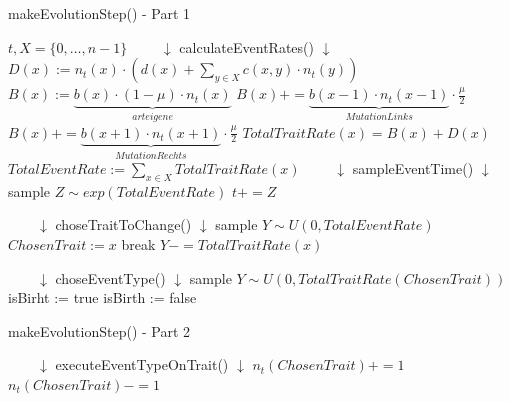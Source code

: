 \documentclass[11pt, a4paper, german]{article}
\theoremstyle{plain}
\begin{document}
	\begin{algorithm}[H]
		\caption{makeEvolutionStep() - Part 1}
		\begin{algorithmic}[1]
			\Require $ t, X = \{0,\dots, n-1\} $
			\State $ \qquad \downarrow $ \textcolor[rgb]{0,0,0.55}{calculateEventRates}() $ \downarrow $
				\State $  D(x) := n_t(x) \cdot \left( d(x) + \sum_{y \in X} c(x,y) \cdot n_t(y) \right) $
				\State $ B(x) := \underbrace{b(x) \cdot (1 - \mu) \cdot n_t(x)}_{arteigene}  $
					\State $ B(x) += \underbrace{b(x-1)\cdot n_t(x-1)}_{Mutation Links} \cdot \frac{\mu}{2} $
				\EndIf
					\State $ B(x) += \underbrace{b(x+1)\cdot n_t(x+1)}_{Mutation Rechts} \cdot \frac{\mu}{2} $
				\EndIf
				\State $ TotalTraitRate(x) = B(x) + D(x) $
			\EndFor
			\State $ TotalEventRate := \sum_{x \in X} TotalTraitRate(x) $
			\State $ \qquad \downarrow $ \textcolor[rgb]{0,0,0.55}{sampleEventTime}() $ \downarrow $
			\State sample $ Z \sim exp(TotalEventRate) $
			\State $ t += Z $
			
			\State $ \qquad \downarrow $ \textcolor[rgb]{0,0,0.55}{choseTraitToChange}() $ \downarrow $
			\State sample $ Y \sim U(0,TotalEventRate) $
					\State $ ChosenTrait := x $
					\State break
				\EndIf
				\State $ Y -= TotalTraitRate(x) $
			\EndFor
			
			\State $ \qquad \downarrow $ \textcolor[rgb]{0,0,0.55}{choseEventType()} $ \downarrow $
			\State sample $ Y \sim U(0,TotalTraitRate(ChosenTrait)) $
				\State isBirht := true
			\Else
				\State isBirth := false
			\EndIf
		\end{algorithmic}
	\end{algorithm}
	
	\begin{algorithm}[H]
		\caption{makeEvolutionStep() - Part 2}
		\begin{algorithmic}[1]
			\State $ \qquad \downarrow $
			\textcolor[rgb]{0,0,0.55}{executeEventTypeOnTrait()} $ \downarrow $
				\State $ n_t(ChosenTrait) += 1 $
			\Else
					\State $ n_t(ChosenTrait) -= 1 $
				\EndIf
			\EndIf
		\end{algorithmic}
	\end{algorithm}
	
\end{document}
